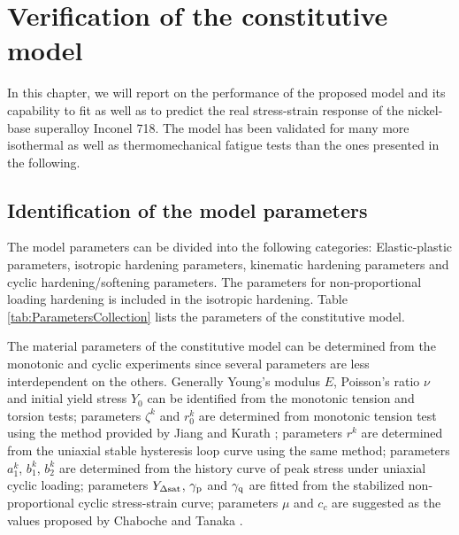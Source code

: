 \chapter{Verification of the constitutive model}
\noindent
In this chapter, we will report on the performance of the proposed model and its capability to fit as well as to predict the real stress-strain response of the nickel-base superalloy Inconel 718.
The model has been validated for many more isothermal as well as thermomechanical fatigue tests than the ones presented in the following.

\section{Identification of the model parameters}
\noindent
The model parameters can be divided into the following categories: Elastic-plastic parameters, isotropic hardening parameters, kinematic hardening parameters and cyclic hardening/softening parameters. The parameters for non-proportional loading hardening is included in the isotropic hardening.
Table \ref{tab:ParametersCollection} lists the parameters of the constitutive model.

The material parameters of the constitutive model can be determined from the monotonic and cyclic experiments since several parameters are less interdependent on the others.
Generally Young's modulus $E$, Poisson's ratio $\nu$ and initial yield stress $Y_0$ can be identified from the monotonic tension and torsion tests;
parameters $\zeta^k$ and $r_0^k$ are determined from monotonic tension test using the method provided by Jiang and Kurath \cite{Jiang1996387};
parameters $r^k$ are determined from the uniaxial stable hysteresis loop curve using the same method;
parameters $a_1^k$, $b_1^k$, $b_2^k$ are determined from the history curve of peak stress under uniaxial cyclic loading;
parameters $Y_{\Delta \rm{sat}}$, $\gamma_{\rm{p}}$ and $\gamma_{\rm{q}}$ are fitted from the stabilized non-proportional cyclic stress-strain curve;
parameters $\mu$ and $c_c$ are suggested as the values proposed by Chaboche \cite{Chaboche1986149} and Tanaka \cite{tanaka1994nonproportionality}.

